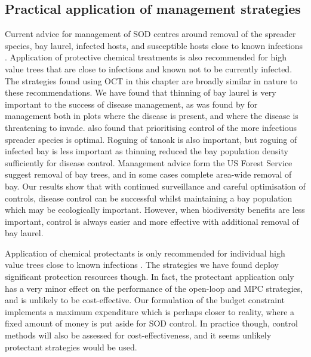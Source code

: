 \subsection{Practical application of management strategies}

Current advice for management of SOD centres around removal of the spreader species, bay laurel, infected hosts, and susceptible hosts close to known infections \citep{comtf_sudden_2014}. Application of protective chemical treatments is also recommended for high value trees that are close to infections and known not to be currently infected. The strategies found using OCT in this chapter are broadly similar in nature to these recommendations. We have found that thinning of bay laurel is very important to the success of disease management, as was found by \citet{cobb_resiliency_2017} for management both in plots where the disease is present, and where the disease is threatening to invade. \citet{ndeffo_mbah_optimization_2010} also found that prioritising control of the more infectious spreader species is optimal. Roguing of tanoak is also important, but roguing of infected bay is less important as thinning reduced the bay population density sufficiently for disease control. Management advice form the US Forest Service \citep{swiecki_reference_2013} suggest removal of bay trees, and in some cases complete area-wide removal of bay. Our results show that with continued surveillance and careful optimisation of controls, disease control can be successful whilst maintaining a bay population which may be ecologically important. However, when biodiversity benefits are less important, control is always easier and more effective with additional removal of bay laurel.

Application of chemical protectants is only recommended for individual high value trees close to known infections \citep{comtf_sudden_2014}. The strategies we have found deploy significant protection resources though. In fact, the protectant application only has a very minor effect on the performance of the open-loop and MPC strategies, and is unlikely to be cost-effective. Our formulation of the budget constraint implements a maximum expenditure which is perhaps closer to reality, where a fixed amount of money is put aside for SOD control. In practice though, control methods will also be assessed for cost-effectiveness, and it seems unlikely protectant strategies would be used.

